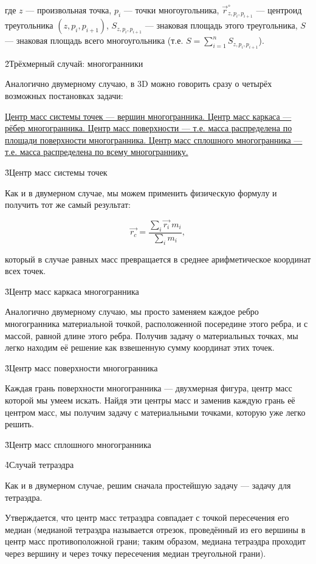 где $z$ --- произвольная точка, $p_i$ --- точки многоугольника, ${\vec r}_{z,p_i,p_{i+1}}^\circ$ --- центроид треугольника $(z,p_i,p_{i+1})$, $S_{z,p_i,p_{i+1}}$ --- знаковая площадь этого треугольника, $S$ --- знаковая площадь всего многоугольника (т.е. $S = \sum_{i=1}^{n} S_{z,p_i,p_{i+1}}$).


\h2{Трёхмерный случай: многогранники}

Аналогично двумерному случаю, в 3D можно говорить сразу о четырёх возможных постановках задачи:

\ul{
\li Центр масс системы точек --- вершин многогранника.
\li Центр масс каркаса --- рёбер многогранника.
\li Центр масс поверхности --- т.е. масса распределена по площади поверхности многогранника.
\li Центр масс сплошного многогранника --- т.е. масса распределена по всему многограннику.
}


\h3{Центр масс системы точек}

Как и в двумерном случае, мы можем применить физическую формулу и получить тот же самый результат:

$$ \vec{r_c} = \frac{ \sum\limits_i \vec{r_i} ~ m_i }{ \sum\limits_i m_i }, $$

который в случае равных масс превращается в среднее арифметическое координат всех точек.


\h3{Центр масс каркаса многогранника}

Аналогично двумерному случаю, мы просто заменяем каждое ребро многогранника материальной точкой, расположенной посередине этого ребра, и с массой, равной длине этого ребра. Получив задачу о материальных точках, мы легко находим её решение как взвешенную сумму координат этих точек.


\h3{Центр масс поверхности многогранника}

Каждая грань поверхности многогранника --- двухмерная фигура, центр масс которой мы умеем искать. Найдя эти центры масс и заменив каждую грань её центром масс, мы получим задачу с материальными точками, которую уже легко решить.


\h3{Центр масс сплошного многогранника}

\h4{Случай тетраэдра}

Как и в двумерном случае, решим сначала простейшую задачу --- задачу для тетраэдра.

Утверждается, что центр масс тетраэдра совпадает с точкой пересечения его медиан (медианой тетраэдра называется отрезок, проведённый из его вершины в центр масс противоположной грани; таким образом, медиана тетраэдра проходит через вершину и через точку пересечения медиан треугольной грани).

